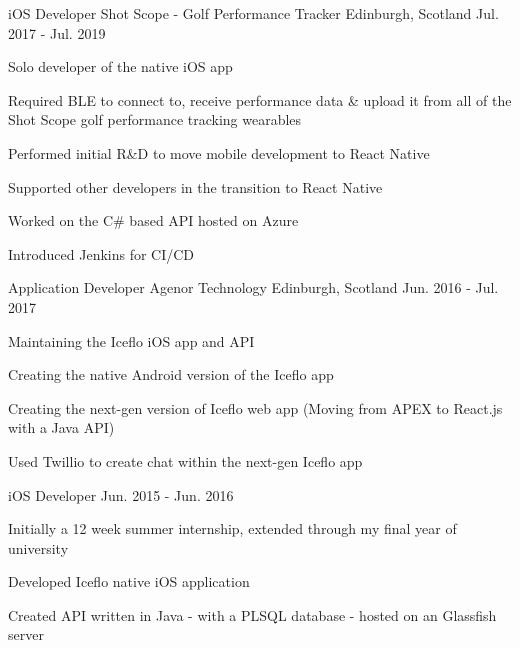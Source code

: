 \begin{cventries}
  \cventry
    {iOS Developer} %
    {Shot Scope - Golf Performance Tracker} %
    {Edinburgh, Scotland} %
    {Jul. 2017 - Jul. 2019} %
    {
      \begin{cvitems} %
        \item {Solo developer of the native iOS app}
        \item {Required BLE to connect to, receive performance data \& upload it from all of the Shot Scope golf performance tracking wearables}
        \item {Performed initial R\&D to move mobile development to React Native}
        \item {Supported other developers in the transition to React Native}
        \item {Worked on the C\# based API hosted on Azure}
        \item {Introduced Jenkins for CI/CD}
      \end{cvitems}
    }

  \cventry
    {Application Developer} %
    {Agenor Technology} %
    {Edinburgh, Scotland} %
    {Jun. 2016 - Jul. 2017} %
    {
      \begin{cvitems} %
        \item {Maintaining the Iceflo iOS app and API}
        \item {Creating the native Android version of the Iceflo app}
        \item {Creating the next-gen version of Iceflo web app (Moving from APEX to React.js with a Java API)}
        \item {Used Twillio to create chat within the next-gen Iceflo app}
      \end{cvitems}
    }

  \cventry
    {iOS Developer} %
    {} %
    {} %
    {Jun. 2015 - Jun. 2016} %
    {
      \begin{cvitems} %
        \item {Initially a 12 week summer internship, extended through my final year of university}
        \item {Developed Iceflo native iOS application}
        \item {Created API written in Java - with a PLSQL database - hosted on an Glassfish server}
      \end{cvitems}
    }


\end{cventries}
